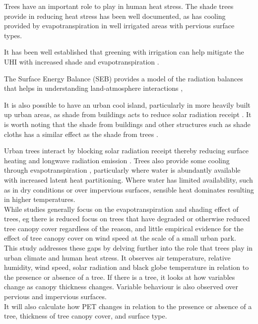 \documentclass[twocolumn, a4paper]{article}
\begin{document}
Trees have an important role to play in human heat stress. The shade trees provide in reducing heat stress has been well documented, as has cooling provided by evapotranspiration in well irrigated areas with pervious surface types.

It has been well established that greening with irrigation can help mitigate the UHI \cite{RN231} \cite{RN715} with increased shade and evapotranspiration \cite{RN2053}.

The Surface Energy Balance (SEB) provides a model of the radiation balances that helps in understanding land-atmosphere interactions \cite{RN2014} \cite{RN990},

It is also possible to have an urban cool island, particularly in more heavily built up urban areas, as shade from buildings acts to reduce solar radiation receipt \cite{RN2087}. It is worth noting that the shade from buildings and other structures such as shade cloths has a similar effect as the shade from trees \cite{RN2102} \cite{SHASHUABAR2009179}.

Urban trees interact by blocking solar radiation receipt thereby reducing surface heating and longwave radiation emission \cite{RN1128}. Trees also provide some cooling through evapotranspiration \cite{RN2053}, particularly where water is abundantly available \cite{RN231} with increased latent heat partitioning. Where water has limited availability, such as in dry conditions or over impervious surfaces, sensible heat dominates resulting in higher temperatures.
\\
While studies generally focus on the evapotranspiration and shading effect of trees, eg \cite{ISI:000339905000001} \cite{RN2073} there is reduced focus on trees that have degraded or otherwise reduced tree canopy cover regardless of the reason, and little empirical evidence for the effect of tree canopy cover on wind speed at the scale of a small urban park.
\\
This study addresses these gaps by delving further into the role that trees play in urban climate and human heat stress. It observes air temperature, relative humidity, wind speed, solar radiation and black globe temperature in relation to the presence or absence of a tree. If there is a tree, it looks at how variables change as canopy thickness changes. Variable behaviour is also observed over pervious and impervious surfaces.
\\
It will also calculate how PET changes in relation to the presence or absence of a tree, thickness of tree canopy cover, and surface type.
\end{document}
